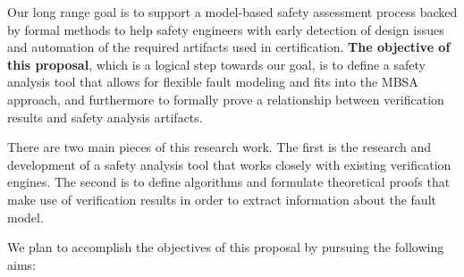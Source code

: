 Our long range goal is to support a model-based safety assessment process backed by formal methods to help safety engineers with early detection of design issues and automation of the required artifacts used in certification. \textbf{The objective of this proposal}, which is a logical step towards our goal, is to define a safety analysis tool that allows for flexible fault modeling and fits into the MBSA approach, and furthermore to formally prove a relationship between verification results and safety analysis artifacts.

There are two main pieces of this research work. The first is the research and development of a safety analysis tool that works closely with existing verification engines. The second is to define algorithms and formulate theoretical proofs that make use of verification results in order to extract information about the fault model.  

We plan to accomplish the objectives of this proposal by pursuing the following aims:

